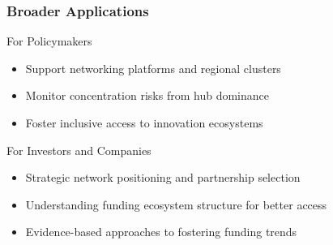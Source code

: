 
\begin{frame}
\frametitle{Broader Applications}

\begin{block}{For Policymakers}
\begin{itemize}
    \item Support networking platforms and regional clusters
    \item Monitor concentration risks from hub dominance
    \item Foster inclusive access to innovation ecosystems
\end{itemize}
\end{block}

\vspace{0.4cm}

\begin{block}{For Investors and Companies}
\begin{itemize}
    \item Strategic network positioning and partnership selection
    \item Understanding funding ecosystem structure for better access
    \item Evidence-based approaches to fostering funding trends
\end{itemize}
\end{block}

\end{frame}